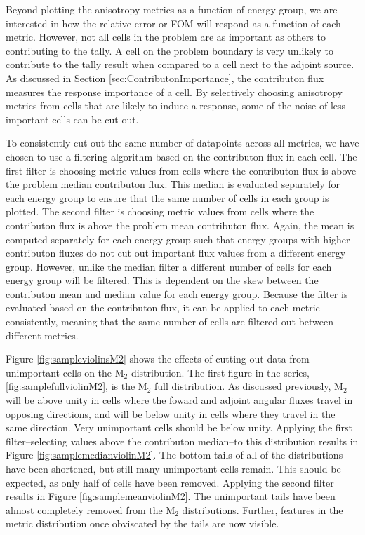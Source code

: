 Beyond plotting the anisotropy metrics as a function of energy group, we are
interested in how the relative error or FOM will respond as a function of each
metric. However, not all cells in the problem are as important as others to
contributing to the tally. A cell on the problem boundary is very unlikely to
contribute to the tally result when compared to a cell next to the adjoint
source. As discussed in Section \ref{sec:ContributonImportance}, the contributon
flux measures the response importance of a cell. By selectively choosing
anisotropy metrics from cells that are likely to induce a response, some of the noise
of less important cells can be cut out.

To consistently cut out the same number of datapoints across all metrics, we
have chosen to use a filtering algorithm based on the contributon flux in each
cell. The first filter is choosing metric values from cells where the
contributon flux is above the problem median contributon flux. This median is
evaluated separately for each energy group to ensure that the same number of
cells in each group is plotted. The second filter is choosing metric values from
cells where the contributon flux is above the problem mean contributon flux.
Again, the mean is computed separately for each energy group such that energy
groups with higher contributon fluxes do not cut out important flux values from
a different energy group. However, unlike the median filter a different number
of cells for each energy group will be filtered. This is dependent on the skew
between the contributon mean and median value for each energy group.
Because the filter is evaluated based on the
contributon flux, it can be applied to each metric consistently, meaning that
the same number of cells are filtered out between different metrics.

Figure \ref{fig:sampleviolinsM2} shows the effects of cutting out data from
unimportant cells on the M$_2$ distribution. The first figure in the series,
\ref{fig:samplefullviolinM2}, is the M$_2$ full distribution. As discussed
previously, M$_2$ will be above unity in cells where the foward and adjoint
angular fluxes travel in opposing directions, and will be below unity in cells
where they travel in the same direction. Very unimportant cells should be below
unity. Applying the first filter--selecting values above the contributon
median--to this distribution results in Figure \ref{fig:samplemedianviolinM2}.
The bottom tails of all of the distributions have been shortened, but still many
unimportant cells remain. This should be expected, as only half of cells have
been removed. Applying the second filter results in Figure
\ref{fig:samplemeanviolinM2}. The unimportant tails have been almost completely
removed from the M$_2$ distributions. Further, features in the metric
distribution once obviscated by the
tails are now visible.

